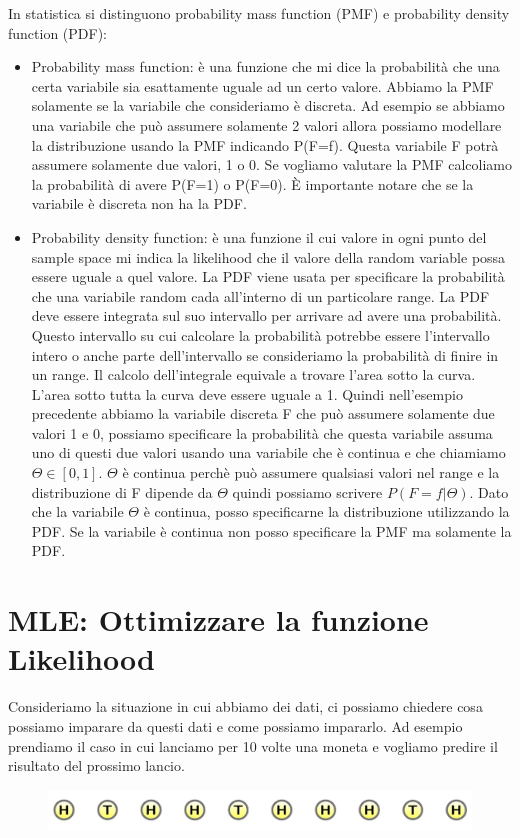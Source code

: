 \documentclass[14pt]{extreport}
\begin{document}
In statistica si distinguono probability mass function (PMF) e probability density function (PDF):
\begin{itemize}
	\item Probability mass function: è una funzione che mi dice la probabilità che una certa variabile sia esattamente uguale ad un certo valore.
	      Abbiamo la PMF solamente se la variabile che consideriamo è discreta. Ad esempio se abbiamo una variabile che può assumere solamente 2
	      valori allora possiamo modellare la distribuzione usando la PMF indicando P(F=f). Questa variabile F potrà assumere solamente due valori, 1
	      o 0. Se vogliamo valutare la PMF calcoliamo la probabilità di avere P(F=1) o P(F=0). È importante notare che se la variabile è discreta non
	      ha la PDF.
	\item Probability density function: è una funzione il cui valore in ogni punto del sample space mi indica la likelihood che il valore della random
	      variable possa essere uguale a quel valore. La PDF viene usata per specificare la probabilità che una variabile random cada all'interno di
	      un particolare range. La PDF deve essere integrata sul suo intervallo per arrivare ad avere una probabilità. Questo intervallo su cui
	      calcolare la probabilità potrebbe essere l'intervallo intero o anche parte dell'intervallo se consideriamo la probabilità di finire in un
	      range. Il calcolo dell'integrale equivale a trovare l'area sotto la curva. L'area sotto tutta la curva deve essere uguale a 1. Quindi
	      nell'esempio precedente abbiamo la variabile discreta F che può assumere solamente due valori 1 e 0, possiamo specificare la probabilità che
	      questa variabile assuma uno di questi due valori usando una variabile che è continua e che chiamiamo $\Theta \in [0,1]$. $\Theta$ è continua
	      perchè può assumere qualsiasi valori nel range e la distribuzione di F dipende da $\Theta$ quindi possiamo scrivere $P(F=f | \Theta)$. Dato
	      che la variabile $\Theta$ è continua, posso specificarne la distribuzione utilizzando la PDF. Se la variabile è continua non posso
	      specificare la PMF ma solamente la PDF.
\end{itemize}

\section{MLE: Ottimizzare la funzione Likelihood}

Consideriamo la situazione in cui abbiamo dei dati, ci possiamo chiedere cosa possiamo imparare da questi dati e come possiamo impararlo. Ad esempio
prendiamo il caso in cui lanciamo per 10 volte una moneta e vogliamo predire il risultato del prossimo lancio.
\begin{figure}[H]
	\centering
	\includegraphics[width=0.8\linewidth]{5.jpeg}
\end{figure}
\end{document}
